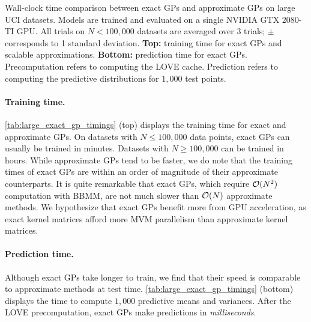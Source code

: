 \begin{table}[t!]
  \vspace{1em}
  \caption[Wall-clock time comparison between exact GPs and approximate GPs on large UCI datasets.]{
    Wall-clock time comparison between exact GPs and approximate GPs on large UCI datasets.
    Models are trained and evaluated on a single NVIDIA GTX 2080-TI GPU.
    All trials on $N < 100,\!000$ datasets are averaged over 3 trials; $\pm$ corresponds to 1 standard deviation.
    {\bf Top:} training time for exact GPs and scalable approximations.
    {\bf Bottom:} prediction time for exact GPs.
    Precomputation refers to computing the LOVE cache.
    Prediction refers to computing the predictive distributions for $1,\!000$ test points.
  }
  \label{tab:large_exact_gp_timings}
  \centering
  \vspace{1em}

  \resizebox{\textwidth}{!}{%
    
  }
  \vspace{1em}

  \resizebox{\textwidth}{!}{%
    
  }

  \vspace{2em}
\end{table}


\paragraph{Training time.}
\cref{tab:large_exact_gp_timings} (top) displays the training time for exact and approximate GPs.
On datasets with $N \leq 100,\!000$ data points, exact GPs can usually be trained in minutes.
Datasets with $N \geq 100,\!000$ can be trained in hours.
While approximate GPs tend to be faster, we do note that the training times of exact GPs are within an order of magnitude of their approximate counterparts.
It is quite remarkable that exact GPs, which require $\bigo{N^2}$ computation with BBMM, are not much slower than $\bigo{N}$ approximate methods.
We hypothesize that exact GPs benefit more from GPU acceleration, as exact kernel matrices afford more MVM parallelism than approximate kernel matrices.

\paragraph{Prediction time.}
Although exact GPs take longer to train, we find that their speed is comparable to approximate methods at test time.
\cref{tab:large_exact_gp_timings} (bottom) displays the time to compute $1,\!000$ predictive means and variances.
After the LOVE precomputation, exact GPs make predictions in \emph{milliseconds}.

